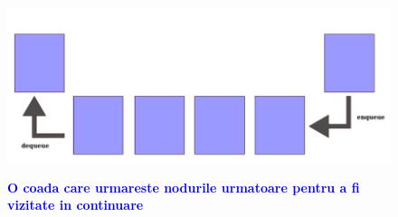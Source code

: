 \documentclass{article}
\begin{document}
\par
\begin{figure}
    \centering
    \includegraphics[width=15cm]{queue-diagram.jpg}
    \bfseries\caption{\textbf{\textcolor{blue}{O coada care urmareste nodurile urmatoare pentru a fi vizitate in continuare}}}
    \vspace{5mm}
\end{figure}
\quad
\end{document}
